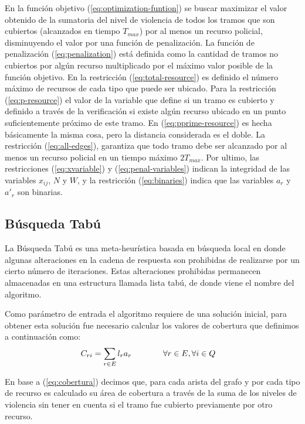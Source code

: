 En la función objetivo (\ref{eq:optimization-funtion}) se buscar maximizar el valor obtenido de la sumatoria del nivel de violencia de todos los tramos que son cubiertos (alcanzados en tiempo $T_{max}$) por al menos un recurso policial, disminuyendo el valor por una función de penalización. La función de penalización (\ref{eq:penalization}) está definida como la cantidad de tramos no cubiertos por algún recurso multiplicado por el máximo valor posible de la función objetivo. En la restricción (\ref{eq:total-resource}) es definido el número máximo de recursos de cada tipo que puede ser ubicado. Para la restricción (\ref{eq:p-resource}) el valor de la variable que define si un tramo es cubierto y definido a través de la verificación si existe algún recurso ubicado en un punto suficientemente próximo de este tramo. En (\ref{eq:pprime-resource}) es hecha básicamente la misma cosa, pero la distancia considerada es el doble. La restricción (\ref{eq:all-edges}), garantiza que todo tramo debe ser alcanzado por al menos un recurso policial en un tiempo máximo $2T_{max}$. Por ultimo, las restricciones (\ref{eq:xvariable}) y (\ref{eq:penal-variables}) indican la integridad de las variables $x_{ij}$, $N$ y $W$, y la restricción (\ref{eq:binaries}) indica que las variables $a_{r}$ y $a'_{r}$ son binarias.

\subsection{Búsqueda Tabú}
La Búsqueda Tabú es una meta-heurística basada en búsqueda local en donde algunas alteraciones en la cadena de respuesta son prohibidas de realizarse por un cierto número de iteraciones\cite{glover1989tabu}. Estas alteraciones prohibidas permanecen almacenadas en una estructura llamada lista tabú, de donde viene el nombre del algoritmo.

Como parámetro de entrada el algoritmo requiere de una solución inicial, para obtener esta solución fue necesario calcular los valores de cobertura que definimos a continuación como:
\begin{alignat}{2}
    C_{ri}\label{eq:cobertura}
    &= \sum_{r \in E} l_{r}a_{r} 
    &&\tab\forall r \in E, \forall i \in Q
\end{alignat}

En base a (\ref{eq:cobertura}) decimos que, para cada arista del grafo y por cada tipo de recurso es calculado su área de cobertura a través de la suma de los niveles de violencia sin tener en cuenta si el tramo fue cubierto previamente por otro recurso.


